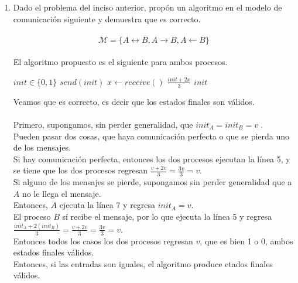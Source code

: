 \documentclass[12pt,a4paper]{report}
\begin{document}
\begin{enumerate}
{
	}
	\item {
	Dado el problema del inciso anterior, propón un algoritmo en el modelo de
	comunicación siguiente y demuestra que es correcto.\\\\
		\begin{equation*}
			\mathcal{M} = \{A \leftrightarrow B, A \rightarrow B, A \leftarrow B \}
		\end{equation*}\\
	El algoritmo propuesto es el siguiente para ambos procesos.\\
		\begin{algorithmic}[1]
			\Require $init \in \{0, 1\}$
				\State $send(init)$
				\State $x \gets receive()$
					\State \Return $\frac{init + 2x}{3}$
				\Else
					\State \Return $init$
				\EndIf
			\EndFunction
		\end{algorithmic}

	Veamos que es correcto, es decir que los estados finales son válidos.\\\\

	Primero, supongamos, sin perder generalidad, que $init_A = init_B = v$ .\\
	Pueden pasar dos cosas, que haya comunicación perfecta o que se pierda uno
	de los mensajes.\\
	Si hay comunicación perfecta, entonces los dos procesos ejecutan la línea 5,
	y se tiene que los dos procesos regresan $\frac{v + 2v}{3} = \frac{3v}{3} = v$.\\
	Si alguno de los mensajes se pierde, supongamos sin perder generalidad que a $A$
	no le llega el mensaje.\\
	Entonces, $A$ ejecuta la línea 7 y regresa $init_A = v$.\\
	El proceso $B$ sí recibe el mensaje, por lo que ejecuta la línea 5 y regresa
	$\frac{init_A + 2 (init_B)}{3} = \frac{v + 2v}{3} = \frac{3v}{3} = v$.\\
	Entonces todos los casos los dos procesos regresan $v$, que es bien 1 o 0,
	ambos estados finales válidos.\\
	Entonces, si las entradas son iguales, el algoritmo produce etados finales válidos.\\\\

}
\end{enumerate}
\end{document}
